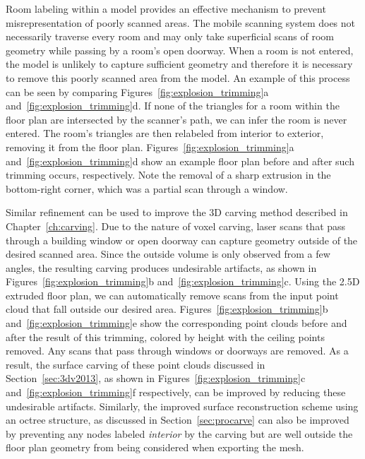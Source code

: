 \documentclass[12pt,onecolumn,oneside]{book}
\begin{document}
Room labeling within a model provides an effective mechanism to prevent misrepresentation of poorly scanned areas.  The mobile scanning system does not necessarily traverse every room and may only take superficial scans of room geometry while passing by a room's open doorway.  When a room is not entered, the model is unlikely to capture sufficient geometry and therefore it is necessary to remove this poorly scanned area from the model.  An example of this process can be seen by comparing Figures~\ref{fig:explosion_trimming}a and~\ref{fig:explosion_trimming}d.  If none of the triangles for a room within the floor plan are intersected by the scanner's path, we can infer the room is never entered.  The room's triangles are then relabeled from interior to exterior, removing it from the floor plan.  Figures~\ref{fig:explosion_trimming}a and~\ref{fig:explosion_trimming}d show an example floor plan before and after such trimming occurs, respectively.  Note the removal of a sharp extrusion in the bottom-right corner, which was a partial scan through a window.

Similar refinement can be used to improve the 3D carving method described in Chapter~\ref{ch:carving}.  Due to the nature of voxel carving, laser scans that pass through a building window or open doorway can capture geometry outside of the desired scanned area.  Since the outside volume is only observed from a few angles, the resulting carving produces undesirable artifacts, as shown in Figures~\ref{fig:explosion_trimming}b and~\ref{fig:explosion_trimming}c.  Using the 2.5D extruded floor plan, we can automatically remove scans from the input point cloud that fall outside our desired area.  Figures~\ref{fig:explosion_trimming}b and~\ref{fig:explosion_trimming}e show the corresponding point clouds before and after the result of this trimming, colored by height with the ceiling points removed.  Any scans that pass through windows or doorways are removed.  As a result, the surface carving of these point clouds discussed in Section~\ref{sec:3dv2013}, as shown in Figures~\ref{fig:explosion_trimming}c and~\ref{fig:explosion_trimming}f respectively, can be improved by reducing these undesirable artifacts.  Similarly, the improved surface reconstruction scheme using an octree structure, as discussed in Section~\ref{sec:procarve} can also be improved by preventing any nodes labeled {\it interior} by the carving but are well outside the floor plan geometry from being considered when exporting the mesh.
\end{document}
